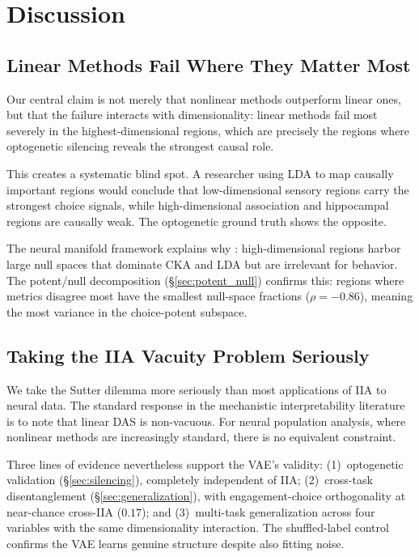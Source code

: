 \documentclass{article}
\begin{document}
\section{Discussion}

\subsection{Linear Methods Fail Where They Matter Most}

Our central claim is not merely that nonlinear methods outperform linear ones, but that the failure interacts with dimensionality: linear methods fail most severely in the highest-dimensional regions, which are precisely the regions where optogenetic silencing reveals the strongest causal role.

This creates a systematic blind spot. A researcher using LDA to map causally important regions would conclude that low-dimensional sensory regions carry the strongest choice signals, while high-dimensional association and hippocampal regions are causally weak. The optogenetic ground truth shows the opposite.

The neural manifold framework explains why \citep{gallego2017neural}: high-dimensional regions harbor large null spaces that dominate CKA and LDA but are irrelevant for behavior. The potent/null decomposition (\S\ref{sec:potent_null}) confirms this: regions where metrics disagree most have the smallest null-space fractions ($\rho = -0.86$), meaning the most variance in the choice-potent subspace.


\subsection{Taking the IIA Vacuity Problem Seriously}

We take the Sutter dilemma more seriously than most applications of IIA to neural data. The standard response in the mechanistic interpretability literature is to note that linear DAS is non-vacuous. For neural population analysis, where nonlinear methods are increasingly standard, there is no equivalent constraint.

Three lines of evidence nevertheless support the VAE's validity: (1)~optogenetic validation (\S\ref{sec:silencing}), completely independent of IIA; (2)~cross-task disentanglement (\S\ref{sec:generalization}), with engagement-choice orthogonality at near-chance cross-IIA ($0.17$); and (3)~multi-task generalization across four variables with the same dimensionality interaction. The shuffled-label control confirms the VAE learns genuine structure despite also fitting noise.
\end{document}
